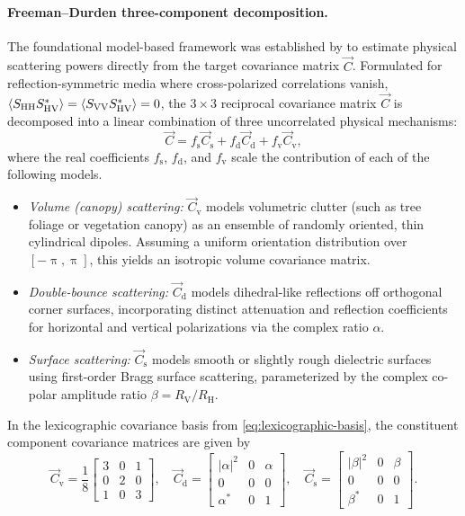 \paragraph{Freeman--Durden three-component decomposition.}
The foundational model-based framework was established by \textcite{freemanThreecomponentScatteringModel1998} to estimate physical scattering powers directly from the target covariance matrix $\vec C$.
Formulated for reflection-symmetric media where cross-polarized correlations vanish, $\langle S_{\mathrm{HH}} S_{\mathrm{HV}}^* \rangle = \langle S_{\mathrm{VV}} S_{\mathrm{HV}}^* \rangle = 0$, the $3 \times 3$ reciprocal covariance matrix $\vec C$ is decomposed into a linear combination of three uncorrelated physical mechanisms:
\begin{equation}
    \label{eq:freeman-durden-decomposition}
    \vec C = f_{\mathrm{s}} \vec C_{\mathrm{s}} + f_{\mathrm{d}} \vec C_{\mathrm{d}} + f_{\mathrm{v}} \vec C_{\mathrm{v}},
\end{equation}
where the real coefficients $f_{\mathrm{s}}$, $f_{\mathrm{d}}$, and $f_{\mathrm{v}}$ scale the contribution of each of the following models.
\begin{itemize}
    \item \textit{Volume (canopy) scattering:} $\vec C_{\mathrm{v}}$ models volumetric clutter (such as tree foliage or vegetation canopy) as an ensemble of randomly oriented, thin cylindrical dipoles.
    Assuming a uniform orientation distribution over $[-\uppi, \uppi]$, this yields an isotropic volume covariance matrix.
    \item \textit{Double-bounce scattering:} $\vec C_{\mathrm{d}}$ models dihedral-like reflections off orthogonal corner surfaces, incorporating distinct attenuation and reflection coefficients for horizontal and vertical polarizations via the complex ratio $\alpha$.
    \item \textit{Surface scattering:} $\vec C_{\mathrm{s}}$ models smooth or slightly rough dielectric surfaces using first-order Bragg surface scattering, parameterized by the complex co-polar amplitude ratio $\beta = R_{\mathrm{V}} / R_{\mathrm{H}}$.
\end{itemize}
In the lexicographic covariance basis from \cref{eq:lexicographic-basis}, the constituent component covariance matrices are given by
\begin{equation}
    \label{eq:freeman-durden-matrices}
    \vec C_{\mathrm{v}} = \frac{1}{8} \begin{bmatrix} 3 & 0 & 1 \\ 0 & 2 & 0 \\ 1 & 0 & 3 \end{bmatrix}, \quad
    \vec C_{\mathrm{d}} = \begin{bmatrix} |\alpha|^2 & 0 & \alpha \\ 0 & 0 & 0 \\ \alpha^* & 0 & 1 \end{bmatrix}, \quad
    \vec C_{\mathrm{s}} = \begin{bmatrix} |\beta|^2 & 0 & \beta \\ 0 & 0 & 0 \\ \beta^* & 0 & 1 \end{bmatrix}.
\end{equation}
